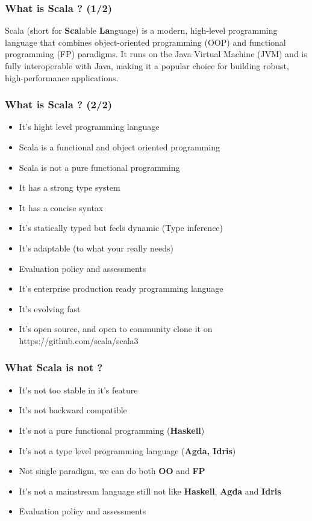 \documentclass{beamer}
\begin{document}

\begin{frame}
\frametitle{What is Scala ? (1/2) }

Scala (short for \textbf{Sca}lable \textbf{La}nguage) is a modern, high-level programming language that combines object-oriented programming (OOP) and functional programming (FP) paradigms. It runs on the Java Virtual Machine (JVM) and is fully interoperable with Java, making it a popular choice for building robust, high-performance applications.

\end{frame}

\begin{frame}
\frametitle{What is Scala ? (2/2) }

\begin{itemize}
    \item It's hight level programming language
    \item Scala is a functional and object oriented programming
    \item Scala is not a pure functional programming
    \item It has a strong type system
    \item It has a concise syntax
    \item It's statically typed but feels dynamic (Type inference)
    \item It's adaptable (to what your really needs)
    \item Evaluation policy and assessments
    \item It's enterprise production ready programming language
    \item It's evolving fast
    \item It's open source, and open to community clone it on https://github.com/scala/scala3
\end{itemize}
\end{frame}


\begin{frame}
\frametitle{What Scala is not ? }

\begin{itemize}
    \item It's not too stable in it's feature
    \item It's not backward compatible
    \item It's not a pure functional programming (\textbf{Haskell})
    \item It's not a type level programming language (\textbf{Agda, Idris})
    \item Not single paradigm, we can do both \textbf{OO} and \textbf{FP} 
    \item It's not a mainstream language still not like \textbf{Haskell}, \textbf{Agda} and \textbf{Idris}
    \item Evaluation policy and assessments
\end{itemize}
\end{frame}
\end{document}
